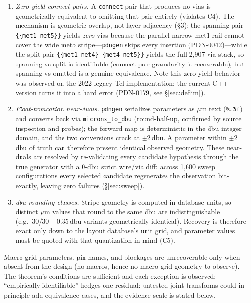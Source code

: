 \documentclass[11pt]{article}
\begin{document}
\begin{enumerate}
\item \emph{Zero-yield connect pairs.} A \texttt{connect} pair that
produces no vias is geometrically equivalent to omitting that pair
entirely (violates C4).  The mechanism is geometric overlap, not layer
adjacency (\S3): the spanning pair \texttt{\{\{met1 met5\}\}} yields
\emph{zero} vias because the parallel narrow met1 rail cannot cover the
wide met5 stripe---\texttt{pdngen} skips every insertion
(PDN-0042)---while the split pair \texttt{\{\{met1 met4\} \{met4
met5\}\}} yields the full 2,907-via stack, so spanning-vs-split is
identifiable (connect-pair granularity is recoverable), but
spanning-vs-omitted is a genuine equivalence.  Note this zero-yield
behavior was observed on the 2022 legacy Tcl implementation; the current
C++ version turns it into a hard error (PDN-0179, see
\S\ref{sec:deflim}).
\item \emph{Float-truncation near-duals.} \texttt{pdngen} serializes
parameters as $\mu$m text (\texttt{\%.3f}) and converts back via
\texttt{microns\_to\_dbu} (round-half-up, confirmed by source inspection
and probes); the forward map is deterministic in the dbu integer domain,
and the two conversions crack at $\pm$2\,dbu.  A parameter within
$\pm$2\,dbu of truth can therefore present identical observed geometry.
These near-duals are resolved by re-validating every candidate
hypothesis through the true generator with a 0-dbu strict wire/via diff:
across 1{,}600 sweep configurations every selected candidate
regenerates the observation bit-exactly, leaving zero failures
(\S\ref{sec:sweep}).
\item \emph{dbu rounding classes.} Stripe geometry is computed in
database units, so distinct $\mu$m values that round to the same dbu are
indistinguishable (e.g.\ 30/30 $\pm$0.35\,dbu variants geometrically
identical).  Recovery is therefore exact only down to the layout
database's unit grid, and parameter values must be quoted with that
quantization in mind (C5).
\end{enumerate}

Macro-grid parameters, pin names, and blockages are
unrecoverable only when absent from the design (no macros, hence no
macro-grid geometry to observe).  The theorem's conditions are
sufficient and each exception is observed; ``empirically identifiable''
hedges one residual: untested joint transforms could in principle add
equivalence cases, and the evidence scale is stated below.
\end{document}
